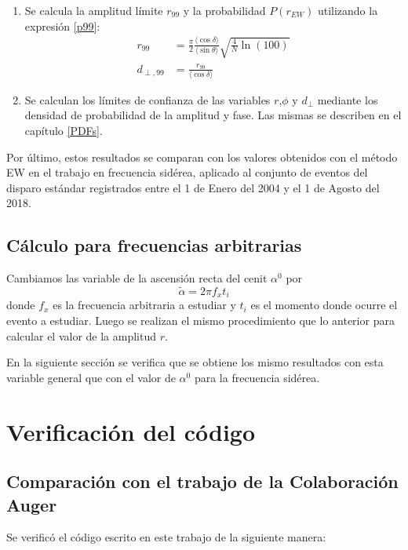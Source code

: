 \begin{enumerate}
    \item Se calcula la amplitud límite $r_{99}$ y la probabilidad  $P(r_{EW})$ utilizando la expresión \ref{p99}:
    \begin{align*}
        r_{99} &= \frac{\pi}{2} \frac{\langle\cos\delta \rangle}{\langle\sin\theta \rangle}\sqrt{\frac{4}{N}\ln(100)}\\
        d_{\perp,99} &= \frac{r_{99}}{\langle\cos\delta \rangle}    
    \end{align*}

    \item Se calculan los límites de confianza de las variables $r$,$\phi$ y $d_\perp$ mediante los densidad de probabilidad de la amplitud y fase. Las mismas se describen en el capítulo \ref{PDFs}.


\end{enumerate}


Por último, estos resultados se comparan con los valores obtenidos con el método EW en el trabajo \cite{Aab_2020} en frecuencia sidérea, aplicado al conjunto de eventos del disparo estándar registrados entre el 1 de Enero del 2004 y el 1 de Agosto del 2018. 


\subsection{Cálculo para frecuencias  arbitrarias}

Cambiamos las variable de la ascensión recta del cenit $\alpha^0$ por
\begin{equation}
    \tilde{\alpha} = 2\pi f_x t_i  \label{ra_arb}
  \end{equation}
donde $f_x$ es la frecuencia arbitraria a estudiar y $t_i$ es el momento donde ocurre el evento a estudiar. Luego se realizan el mismo procedimiento que lo anterior para calcular el valor de la amplitud $r$.

En la siguiente sección se verifica que se obtiene los mismo resultados con esta variable general que con el valor de $\alpha^0$ para la frecuencia sidérea.

\section{Verificación del código}

\subsection{Comparación con el trabajo de la Colaboración Auger}
Se verificó el código escrito en este trabajo de la siguiente manera:

